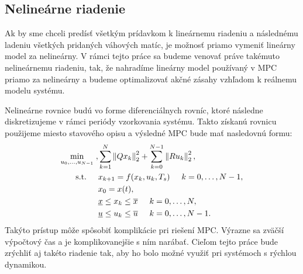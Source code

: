 \subsection{Nelineárne riadenie}
\label{subse:NelinearneMPC}
Ak by sme chceli predísť všetkým prídavkom k lineárnemu riadeniu a následnému ladeniu všetkých pridaných váhových matíc, je možnosť priamo vymeniť lineárny model za nelineárny. V rámci tejto práce sa budeme venovať práve takémuto nelineárnemu riadeniu, tak, že nahradíme lineárny model používaný v MPC priamo za nelineárny a budeme optimalizovať akčné zásahy vzhľadom k reálnemu modelu systému.

Nelineárne rovnice budú vo forme diferenciálnych rovníc, ktoré následne diskretizujeme v rámci periódy vzorkovania systému. Takto získanú rovnicu použijeme miesto stavového opisu a výsledné MPC bude mať nasledovnú formu:
\begin{subequations}
	\begin{align}
	\displaystyle \min_{u_0,...,u_{N-1}} \hspace{0.1cm}, & 
	\sum_{k=1}^{N}\left\lVert Qx_k\right\rVert^{2}_{2}+\sum_{k=0}^{N-1}\left\lVert Ru_k\right\rVert^{2}_{2},\\
	\textrm{s.t.} \hspace{0.5cm} & x_{k+1} = f(x_{k},u_{k},T_{s})\hspace{0.5cm} k=0,\dots,N-1,\\
	& x_{0} = x(t),\\
	& \underline{x} \leq x_{k} \leq \overline{x}\hspace{0.5cm} k=0,\dots,N,\\
	& \underline{u} \leq u_{k} \leq \overline{u}\hspace{0.5cm} k=0,\dots,N-1.
	\end{align}
\end{subequations}
Takýto prístup môže spôsobiť komplikácie pri riešení MPC. Výrazne sa zväčší výpočtový čas a je komplikovanejšie s ním narábať. Cieľom tejto práce bude zrýchliť aj takéto riadenie tak, aby ho bolo možné využiť pri systémoch s rýchlou dynamikou.
